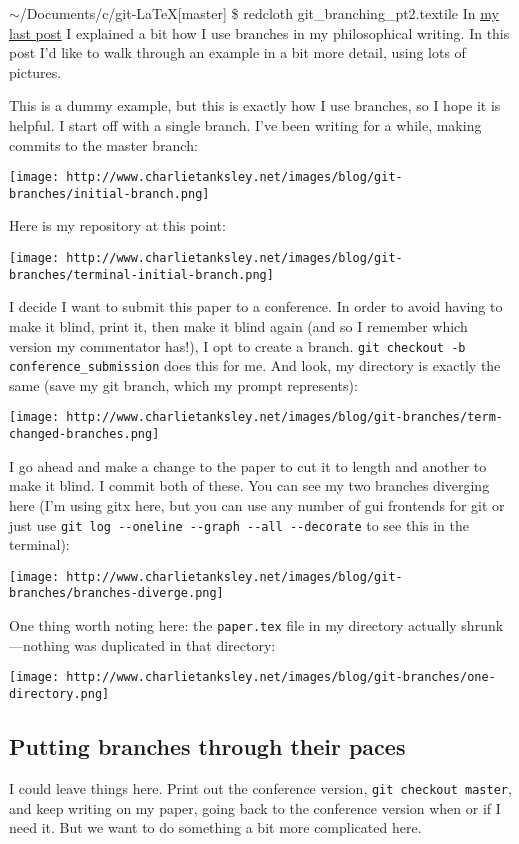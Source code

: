 \documentclass{article}
\begin{document}
\ensuremath{\sim}/Documents/c/git-LaTeX[master] \$ redcloth
git\_branching\_pt2.textile
In
\href{http://www.charlietanksley.net/philtex/git-branching-pt-1-of-2/}{my last post}
I explained a bit how I use branches in my philosophical writing.
In this post I'd like to walk through an example in a bit more
detail, using lots of pictures.

This is a dummy example, but this is exactly how I use branches, so
I hope it is helpful. I start off with a single branch. I've been
writing for a while, making commits to the master branch:

\texttt{[image: http://www.charlietanksley.net/images/blog/git-branches/initial-branch.png]}

Here is my repository at this point:

\texttt{[image: http://www.charlietanksley.net/images/blog/git-branches/terminal-initial-branch.png]}

I decide I want to submit this paper to a conference. In order to
avoid having to make it blind, print it, then make it blind again
(and so I remember which version my commentator has!), I opt to
create a branch. \verb!git checkout -b conference_submission! does
this for me. And look, my directory is exactly the same (save my
git branch, which my prompt represents):

\texttt{[image: http://www.charlietanksley.net/images/blog/git-branches/term-changed-branches.png]}

I go ahead and make a change to the paper to cut it to length and
another to make it blind. I commit both of these. You can see my
two branches diverging here (I'm using gitx here, but you can use
any number of gui frontends for git or just use
\verb!git log --oneline --graph --all --decorate! to see this in
the terminal):

\texttt{[image: http://www.charlietanksley.net/images/blog/git-branches/branches-diverge.png]}

One thing worth noting here: the \verb!paper.tex! file in my
directory actually shrunk—nothing was duplicated in that
directory:

\texttt{[image: http://www.charlietanksley.net/images/blog/git-branches/one-directory.png]}

\subsection{Putting branches through their paces}

I could leave things here. Print out the conference version,
\verb!git checkout master!, and keep writing on my paper, going
back to the conference version when or if I need it. But we want to
do something a bit more complicated here.
\end{document}
